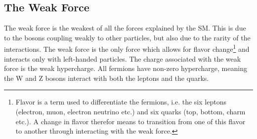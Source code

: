 \subsection{The Weak Force}
The weak force is the weakest of all the forces explained by the \ac{SM}. This is due to the bosons 
coupling weakly to other particles, but also due to the rarity of the interactions. The weak force
is the only force which allows for flavor change\footnote{Flavor is a term used to differentiate the 
fermions, i.e. the six leptons (electron, muon, electron neutrino etc.) and six quarks (top, bottom, charm etc.).
A change in flavor therefor means to transition from one of this flavor to another through interacting with 
the weak force.} and interacts only with left-handed particles. The charge associated with the weak force
is the weak hypercharge. All fermions have non-zero hypercharge, meaning the W and Z bosons interact with both 
the leptons and the quarks.  